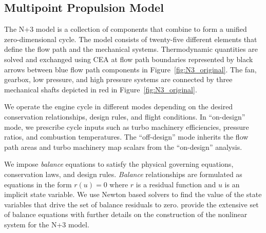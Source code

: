 \documentclass[conf]{new-aiaa}
\begin{document}
\subsection{Multipoint Propulsion Model}
The N+3 model is a collection of components that combine to form a unified zero-dimensional cycle.
The model consists of twenty-five different elements that define the flow path and the mechanical systems.
Thermodynamic quantities are solved and exchanged using CEA at flow path boundaries represented by black arrows between blue flow path components in Figure~\ref{fig:N3_original}.
The fan, gearbox, low pressure, and high pressure systems are connected by three mechanical shafts depicted in red in Figure~\ref{fig:N3_original}.


We operate the engine cycle in different modes depending on the desired conservation relationships, design rules, and flight conditions.
In ``on-design'' mode, we prescribe cycle inputs such as turbo machinery efficiencies, pressure ratios, and combustion temperatures.
The ``off-design'' mode inherits the flow path areas and turbo machinery map scalars from the ``on-design'' analysis.

We impose \emph{balance} equations to satisfy the physical governing equations, conservation laws, and design rules.
\emph{Balance} relationships are formulated as equations in the form $r(u)=0$ where $r$ is a residual function and $u$ is an implicit state variable.
We use Newton based solvers to find the value of the state variables that drive the set of balance residuals to zero.
\citeauthor{Hendricks2019} provide the extensive set of balance equations with further details on the construction of the nonlinear system for the N+3 model.
\end{document}
